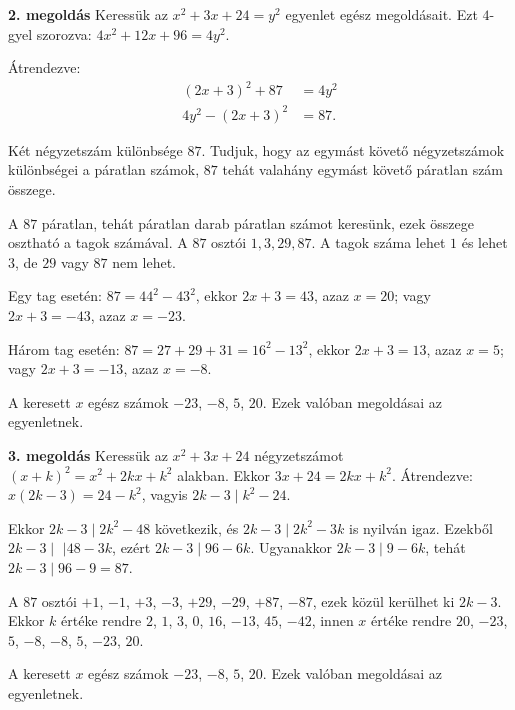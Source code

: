 \documentclass[a4paper,10pt]{article}
\begin{document}
\medskip

{\bf 2. megoldás } Keressük az $x^2+3x+24=y^2$ egyenlet egész megoldásait. Ezt $4$-gyel szorozva:  $4x^2+12x+96=4y^2$. 

\smallskip

\noindent Átrendezve:
\begin{align*}
(2x+3)^2+87&=4y^2\\4y^2-(2x+3)^2&=87.
\end{align*} 

\noindent Két négyzetszám különbsége $87$. Tudjuk, hogy az egymást követő négyzetszámok különbségei a páratlan
számok, $87$ tehát valahány egymást követő páratlan szám összege.



\smallskip

\noindent A $87$ páratlan, tehát páratlan darab páratlan számot keresünk, ezek összege osztható a tagok számával. A $87$ osztói $1, 3, 29, 87$. A tagok száma lehet $1$ és lehet $3$, de $29$ vagy $87$ nem lehet. 

\smallskip

\noindent Egy tag esetén: $87=44^2-43^2$, ekkor $2x+3=43$, azaz $x=20$; vagy $2x+3=-43$, azaz $x=-23$.

\noindent Három tag esetén: $87=27+29+31=16^2-13^2$, ekkor $2x+3=13$, azaz $x=5$; vagy $2x+3=-13$, azaz $x=-8$.

\noindent A keresett $x$ egész számok $-23$, $-8$, $5$, $20$. Ezek valóban megoldásai az egyenletnek. 

\medskip

{\bf 3. megoldás } Keressük az $x^2+3x+24$ négyzetszámot $(x+k)^2=x^2+2kx+k^2$ alakban.
Ekkor $3x+24=2kx+k^2$.
Átrendezve: $x(2k-3)=24-k^2$, vagyis $2k-3 \mid k^2-24$. 

\smallskip

\noindent Ekkor $2k-3\mid 2k^2-48$ következik, és $2k-3\mid 2k^2-3k$ is nyilván igaz.
Ezekből $2k-3 \mid $ $\mid 48- 3k$, ezért $2k-3 \mid 96 -6k$.
Ugyanakkor $2k-3\mid 9 -6k$,
tehát $2k-3 \mid 96-9 =87$.

\smallskip

\noindent A $87$ osztói $+1$, $-1$, $+3$, $-3$, $+29$, $-29$, $+87$, $-87$, ezek közül kerülhet ki $2k-3$.
Ekkor $k$ értéke rendre $2$, $1$, $3$, $0$, $16$, $-13$, $45$, $-42$, innen $x$ értéke rendre $20$, $-23$, $5$, $-8$, $-8$, $5$, $-23$, $20$. 

\noindent A keresett $x$ egész számok $-23$, $-8$, $5$, $20$. Ezek valóban megoldásai az egyenletnek. 
\end{document}
